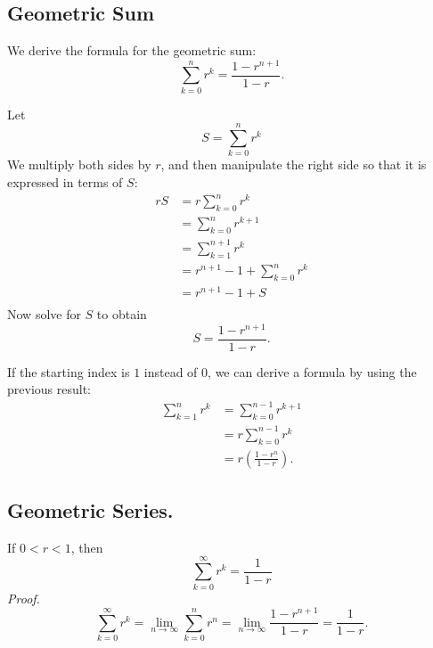 \documentclass[reqno]{immbook}
\numberwithin{equation}{chapter}
\newtheorem{question}{Question}
\numberwithin{question}{section}
\numberwithin{theorem}{chapter}
\numberwithin{figure}{chapter}
\theoremstyle{definition}
\begin{document}
\subsection*{Geometric Sum}
We derive the formula for the
geometric sum:
\begin{equation}
  \sum_{k=0}^{n} r^k = \frac{1- r^{n+1}}{1-r}.
\label{eqn:geometricsum}
\end{equation}

Let
\begin{equation}
  S = \sum_{k=0}^{n} r^k
\end{equation}
We multiply both sides by $r$, and then manipulate
the right side so that it is expressed in terms of $S$:
\begin{equation}
\begin{split}
  r S & = r \sum_{k=0}^{n}r^k \\
     & = \sum_{k=0}^{n}r^{k+1} \\
     & = \sum_{k=1}^{n+1}r^k \\
     & = r^{n+1} - 1 + \sum_{k=0}^{n}r^k \\
     & = r^{n+1} - 1 + S \\
\end{split}
\label{eqn:derivation}
\end{equation}
Now solve for $S$ to obtain
\begin{equation}
   S = \frac{1-r^{n+1}}{1-r} .
\end{equation}

\medskip
\noindent
If the starting index is $1$ instead of $0$,
we can derive a formula by using the previous
result:
\begin{equation}
\begin{split}
  \sum_{k=1}^{n} r^k & = \sum_{k=0}^{n-1}r^{k+1} \\
      & = r \sum_{k=0}^{n-1} r^{k} \\
      & = r\left(\frac{1-r^n}{1-r}\right).
\end{split}
\label{eqn:geomsumfromone}
\end{equation}

\subsection*{Geometric Series.}
If $0 < r < 1$, then
\begin{equation}
   \sum_{k=0}^{\infty} r^k = \frac{1}{1-r}
\end{equation}
\noindent
\emph{Proof.}
\[
  \sum_{k=0}^{\infty} r^k
    = \lim_{n\rightarrow\infty} \sum_{k=0}^{n} r^n
    = \lim_{n\rightarrow\infty} \frac{1-r^{n+1}}{1-r}
    = \frac{1}{1-r}.
\]
%
\end{document}
